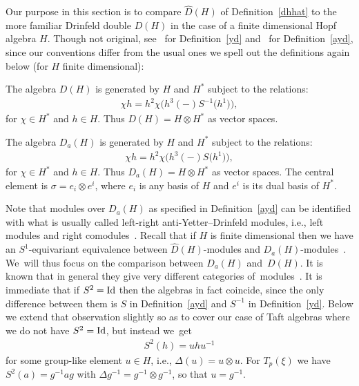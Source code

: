 \documentclass[10pt,a4paper]{amsart}
\numberwithin{equation}{section}
\newcommand{\ot}{\otimes}
\begin{document}
Our purpose in this section is to compare $\widehat{D}(H)$ of Definition~\ref{dhhat} to the more familiar Drinfeld double $D(H)$ in the case of a finite dimensional Hopf algebra $H$. Though not original, see~\cite{quantumgroups} for Definition~\ref{yd} and~\cite{HKRS2} for Definition~\ref{ayd}, since our conventions differ from the usual ones we spell out the definitions again below (for $H$ finite dimensional):

\begin{Definition}\label{yd}
The algebra $D(H)$ is generated by $H$ and $H^*$ subject to the relations:
\begin{gather}
\chi h=h^2\chi\big(h^3(-)S^{-1}\big(h^1\big)\big),
\end{gather}
for $\chi\in H^*$ and $h\in H$. Thus $D(H)=H\ot H^*$ as vector spaces.
\end{Definition}

\begin{Definition}\label{ayd}
The algebra $D_a(H)$ is generated by $H$ and $H^*$ subject to the relations:
\begin{gather}
\chi h=h^2\chi\big(h^3(-)S\big(h^1\big)\big),
\end{gather}
for $\chi\in H^*$ and $h\in H$. Thus $D_a(H)=H\ot H^*$ as vector spaces. The central element is $\sigma=e_i\ot e^i$, where $e_i$ is any basis of $H$ and $e^i$ is its dual basis of $H^*$.
\end{Definition}

Note that modules over $D_a(H)$ as specified in Definition~\ref{ayd} can be identified with what is usually called left-right anti-Yetter--Drinfeld modules, i.e., left modules and right como\-du\-les~\cite{HKRS2}. Recall that if $H$ is finite dimensional then we have an $S^1$-equivariant equivalence between $\widehat{D}(H)$-modules and $D_a(H)$-modules~\cite{s2}. We~will thus focus on the comparison between $D_a(H)$ and~$D(H)$. It is known that in general they give very different categories of~modules~\cite{gentaft}. It is immediate that if $S^2={\rm Id}$ then the algebras in fact coincide, since the only difference bet\-ween them is $S$ in Definition~\ref{ayd} and $S^{-1}$ in Definition~\ref{yd}. Below we extend that observation slightly so as to cover our case of Taft algebras where we do not have $S^2={\rm Id}$, but instead we~get
\begin{gather}
S^2(h)=uhu^{-1}
\end{gather}
for some group-like element $u\in H$, i.e., $\Delta(u)=u\ot u$. For $T_p(\xi)$ we have $S^2(a)=g^{-1}ag$ with $\Delta g^{-1}=g^{-1} \ot g^{-1}$, so that $u=g^{-1}$.
\end{document}

